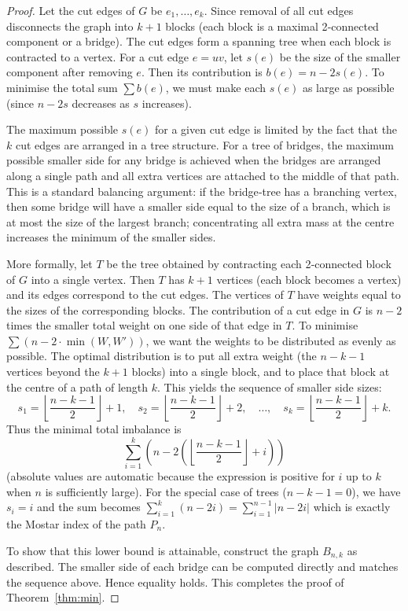 \documentclass[12pt,a4paper]{article}
\theoremstyle{definition}
\begin{document}
\begin{proof}
Let the cut edges of \(G\) be \(e_1,\dots,e_k\). Since removal of all cut edges disconnects the graph into \(k+1\) blocks (each block is a maximal 2‑connected component or a bridge). The cut edges form a spanning tree when each block is contracted to a vertex. For a cut edge \(e=uv\), let \(s(e)\) be the size of the smaller component after removing \(e\). Then its contribution is \(b(e)=n-2s(e)\). To minimise the total sum \(\sum b(e)\), we must make each \(s(e)\) as large as possible (since \(n-2s\) decreases as \(s\) increases).

The maximum possible \(s(e)\) for a given cut edge is limited by the fact that the \(k\) cut edges are arranged in a tree structure. For a tree of bridges, the maximum possible smaller side for any bridge is achieved when the bridges are arranged along a single path and all extra vertices are attached to the middle of that path. This is a standard balancing argument: if the bridge‑tree has a branching vertex, then some bridge will have a smaller side equal to the size of a branch, which is at most the size of the largest branch; concentrating all extra mass at the centre increases the minimum of the smaller sides.

More formally, let \(T\) be the tree obtained by contracting each 2‑connected block of \(G\) into a single vertex. Then \(T\) has \(k+1\) vertices (each block becomes a vertex) and its edges correspond to the cut edges. The vertices of \(T\) have weights equal to the sizes of the corresponding blocks. The contribution of a cut edge in \(G\) is \(n-2\) times the smaller total weight on one side of that edge in \(T\). To minimise \(\sum (n-2\cdot\min(W,W'))\), we want the weights to be distributed as evenly as possible. The optimal distribution is to put all extra weight (the \(n-k-1\) vertices beyond the \(k+1\) blocks) into a single block, and to place that block at the centre of a path of length \(k\). This yields the sequence of smaller side sizes:
\[
s_1 = \left\lfloor\frac{n-k-1}{2}\right\rfloor + 1,\quad
s_2 = \left\lfloor\frac{n-k-1}{2}\right\rfloor + 2,\quad \dots,\quad
s_k = \left\lfloor\frac{n-k-1}{2}\right\rfloor + k.
\]
Thus the minimal total imbalance is
\[
\sum_{i=1}^{k} \left( n - 2\left( \left\lfloor\frac{n-k-1}{2}\right\rfloor + i \right) \right)
\]
(absolute values are automatic because the expression is positive for \(i\) up to \(k\) when \(n\) is sufficiently large). For the special case of trees (\(n-k-1=0\)), we have \(s_i = i\) and the sum becomes \(\sum_{i=1}^{k} (n-2i) = \sum_{i=1}^{n-1} |n-2i|\) which is exactly the Mostar index of the path \(P_n\).

To show that this lower bound is attainable, construct the graph \(B_{n,k}\) as described. The smaller side of each bridge can be computed directly and matches the sequence above. Hence equality holds. This completes the proof of Theorem~\ref{thm:min}.
\end{proof}
\end{document}
